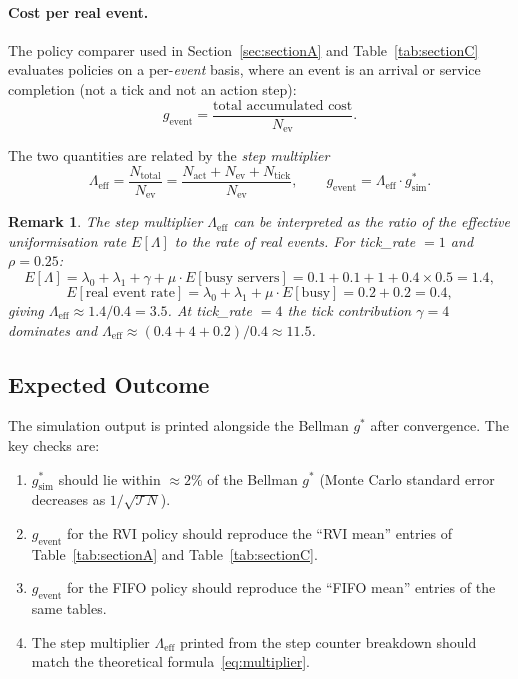 \documentclass[11pt,a4paper]{article}
\newtheorem{remark}{Remark}
\begin{document}
\paragraph{Cost per real event.}
The policy comparer used in Section~\ref{sec:sectionA} and Table~\ref{tab:sectionC}
evaluates policies on a per-\emph{event} basis, where an event is an arrival or
service completion (not a tick and not an action step):
\begin{equation}
  g_\text{event}
    = \frac{\text{total accumulated cost}}{N_\text{ev}}.
  \label{eq:g_per_event}
\end{equation}

The two quantities are related by the \emph{step multiplier}
\begin{equation}
  \Lambda_\text{eff}
    = \frac{N_\text{total}}{N_\text{ev}}
    = \frac{N_\text{act} + N_\text{ev} + N_\text{tick}}{N_\text{ev}},
  \qquad
  g_\text{event} = \Lambda_\text{eff} \cdot g^*_\text{sim}.
  \label{eq:multiplier}
\end{equation}

\begin{remark}
  The step multiplier $\Lambda_\text{eff}$ can be interpreted as the ratio of
  the effective uniformisation rate $E[\Lambda]$ to the rate of real events.
  For tick\_rate $= 1$ and $\rho = 0.25$:
  \[
    E[\Lambda]
      = \lambda_0 + \lambda_1 + \gamma + \mu \cdot E[\text{busy servers}]
      = 0.1 + 0.1 + 1 + 0.4 \times 0.5
      = 1.4,
  \]
  \[
    E[\text{real event rate}]
      = \lambda_0 + \lambda_1 + \mu \cdot E[\text{busy}]
      = 0.2 + 0.2 = 0.4,
  \]
  giving $\Lambda_\text{eff} \approx 1.4 / 0.4 = 3.5$.  At tick\_rate $= 4$
  the tick contribution $\gamma = 4$ dominates and $\Lambda_\text{eff} \approx
  (0.4 + 4 + 0.2) / 0.4 \approx 11.5$.
\end{remark}

\subsection{Expected Outcome}

The simulation output is printed alongside the Bellman $g^*$ after convergence.
The key checks are:
\begin{enumerate}
  \item $g^*_\text{sim}$ should lie within $\approx 2\%$ of the Bellman $g^*$
        (Monte Carlo standard error decreases as $1/\sqrt{\mathcal{T} N}$).
  \item $g_\text{event}$ for the RVI policy should reproduce the ``RVI mean''
        entries of Table~\ref{tab:sectionA} and Table~\ref{tab:sectionC}.
  \item $g_\text{event}$ for the FIFO policy should reproduce the
        ``FIFO mean'' entries of the same tables.
  \item The step multiplier $\Lambda_\text{eff}$ printed from the step counter
        breakdown should match the theoretical formula~\eqref{eq:multiplier}.
\end{enumerate}
\end{document}
